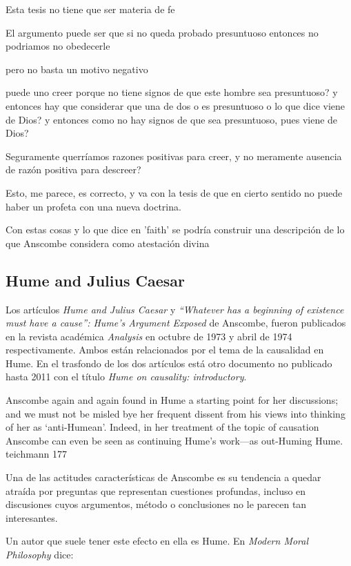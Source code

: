 Esta tesis no tiene que ser materia de fe

El argumento puede ser que si no queda probado presuntuoso entonces no podriamos no
obedecerle

pero no basta un motivo negativo

puede uno creer porque no tiene signos de que este hombre sea presuntuoso?
y entonces hay que considerar que una de dos o es presuntuoso o lo que dice viene de
Dios? y entonces como no hay signos de que sea presuntuoso, pues viene de Dios?

Seguramente querríamos razones positivas para creer, y no meramente ausencia de razón
positiva para descreer?

Esto, me parece, es correcto, y va con la tesis de que en cierto sentido no puede haber
un profeta con una nueva doctrina.

Con estas cosas y lo que dice en 'faith' se podría construir una descripción de lo que
Anscombe considera como atestación divina

\subsection{Hume and Julius Caesar}

Los artículos \emph{Hume and Julius Caesar} y \emph{``Whatever has a beginning
  of existence must have a cause'': Hume’s Argument Exposed} de Anscombe, fueron
publicados en la revista académica \emph{Analysis} en octubre de 1973 y abril de
1974 respectivamente. Ambos están relacionados por el tema de la causalidad en
Hume. En el trasfondo de los dos artículos está otro documento no publicado
hasta 2011 con el título \emph{Hume on causality: introductory}.

Anscombe again and again found in Hume a starting point for her discussions; and
we must not be misled bye her frequent dissent from his views into thinking of
her as `anti-Humean'. Indeed, in her treatment of the topic of causation
Anscombe can even be seen as continuing Hume's work---as out-Huming Hume.
teichmann 177

  Una de las actitudes características de Anscombe es su tendencia a quedar
  atraída por preguntas que representan cuestiones profundas, incluso en
  discusiones cuyos argumentos, método o conclusiones no le parecen tan
  interesantes.

  Un autor que suele tener este efecto en ella es Hume. En \emph{Modern Moral
    Philosophy} dice:


